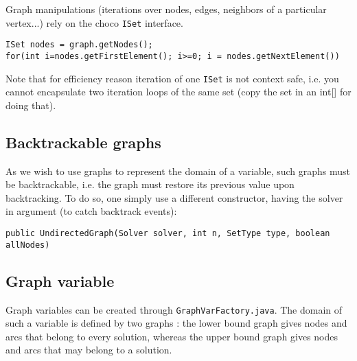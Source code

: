 \documentclass{article}
\begin{document}
Graph manipulations (iterations over nodes, edges, neighbors of a particular vertex...) rely on the choco \texttt{ISet} interface. 
\begin{lstlisting}
ISet nodes = graph.getNodes();
for(int i=nodes.getFirstElement(); i>=0; i = nodes.getNextElement())
\end{lstlisting}
Note that for efficiency reason iteration of one \texttt{ISet} is not context safe, i.e. you cannot encapsulate two iteration loops of the same set (copy the set in an int[] for doing that).
\subsection{Backtrackable graphs}

As we wish to use graphs to represent the domain of a variable, such graphs must be backtrackable, i.e. the graph must restore its previous value upon backtracking. 
To do so, one simply use a different constructor, having the solver in argument (to catch backtrack events):
\begin{lstlisting}
public UndirectedGraph(Solver solver, int n, SetType type, boolean allNodes)
\end{lstlisting}

\subsection{Graph variable}

Graph variables can be created through \texttt{GraphVarFactory.java}. The domain of such a variable is defined by two graphs : the lower bound graph gives nodes and arcs that belong to every solution, whereas the upper bound graph gives nodes and arcs that may belong to a solution. 

\lstset{language=Java} 

 
\end{document}

